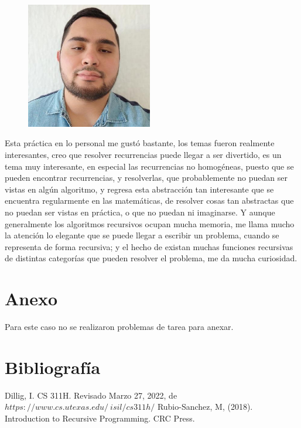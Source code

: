 \documentclass[12pt,twoside]{article}
\begin{document}
\begin{figure}
    \includegraphics[width=5.5cm]{me.jpg}
\end{figure} 
Esta práctica en lo personal me gustó bastante, los temas fueron realmente interesantes, creo que resolver recurrencias puede llegar a ser divertido, es un tema muy interesante, en especial las recurrencias no homogéneas, puesto que se pueden encontrar recurrencias, y resolverlas, que probablemente no puedan ser vistas en algún algoritmo, y regresa esta abstracción tan interesante que se encuentra regularmente en las matemáticas, de resolver cosas tan abstractas que no puedan ser vistas en práctica, o que no puedan ni imaginarse. Y aunque generalmente los algoritmos recursivos ocupan mucha memoria, me llama mucho la atención lo elegante que se puede llegar a escribir un problema, cuando se representa de forma recursiva; y el hecho de existan muchas funciones recursivas de distintas categorías que pueden resolver el problema, me da mucha curiosidad.
\newpage
\section{Anexo}
Para este caso no se realizaron problemas de tarea para anexar.

\section{Bibliograf\'ia}
Dillig, I. CS 311H. Revisado Marzo 27, 2022, de $https://www.cs.utexas.edu/~isil/cs311h/$
\newline
Rubio-Sanchez, M, (2018). Introduction to Recursive Programming. CRC Press.
\medskip
\end{document}
